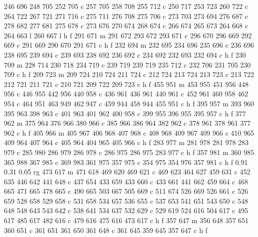 {{        246 696 248 705 252 705 c
        257 705 258 708 255 712 c
        250 717 253 723 260 722 c
        264 722 267 721 271 716 c
        275 711 276 708 275 706 c
        273 703 273 694 276 687 c
        278 682 277 681 275 678 c
        273 676 270 674 268 674 c
        266 674 265 673 264 668 c
        264 663 l
        260 667 l
        h f
        291 671 m
        291 672 293 672 293 671 c
        296 670 296 669 292 669 c
        291 669 290 670 291 671 c
        h f
        232 694 m
        232 695 234 696 235 696 c
        236 696 238 695 239 694 c
        239 693 238 692 236 692 c
        234 692 232 693 232 694 c
        h f
        230 709 m
        228 714 230 718 234 719 c
        239 719 239 719 235 712 c
        232 706 231 705 230 709 c
        h f
        209 723 m
        209 724 210 724 211 724 c
        212 724 213 724 213 723 c
        213 722 212 721 211 721 c
        210 721 209 722 209 723 c
        h f
        455 951 m
        453 955 451 956 448 956 c
        446 955 442 956 440 958 c
        436 961 436 961 440 961 c
        452 961 460 958 462 954 c
        464 951 463 949 462 947 c
        459 944 458 944 455 951 c
        h f
        395 957 m
        393 960 395 963 398 963 c
        401 963 401 962 400 958 c
        399 955 396 955 395 957 c
        h f
        377 962 m
        375 964 376 966 380 966 c
        385 966 386 964 382 962 c
        378 961 378 961 377 962 c
        h f
        405 966 m
        405 967 406 968 407 968 c
        408 968 409 967 409 966 c
        410 965 409 964 407 964 c
        405 964 404 965 405 966 c
        h f
        283 977 m
        281 978 281 978 283 979 c
        285 980 286 979 286 978 c
        286 975 286 975 283 977 c
        h f
        357 981 m
        360 985 365 988 367 985 c
        369 983 361 975 357 975 c
        354 975 354 976 357 981 c
        h f
        0.91 0.31 0.05 rg
        473 617 m
        471 618 469 620 469 621 c
        469 623 464 627 459 631 c
        452 635 446 642 441 648 c
        437 654 433 659 433 660 c
        433 661 441 662 459 664 c
        468 665 471 665 478 665 c
        490 665 503 667 505 669 c
        511 674 526 669 526 661 c
        526 659 528 658 529 658 c
        531 658 534 657 536 655 c
        537 653 541 651 543 650 c
        548 648 548 643 543 642 c
        538 641 534 637 532 629 c
        529 619 524 616 504 617 c
        495 617 485 617 482 616 c
        479 616 475 616 473 617 c
        h f
        357 647 m
        356 648 357 651 360 651 c
        361 651 361 650 361 648 c
        361 645 359 645 357 647 c
        h f
}}
